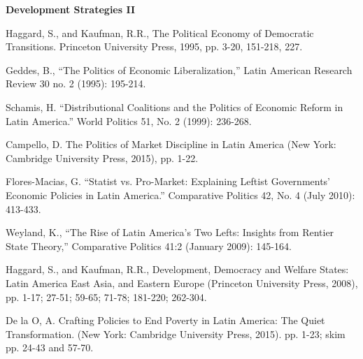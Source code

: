 \documentclass[letterpaper]{article}
\renewenvironment{itemize}{
  \begin{list}{}{
    \setlength{\leftmargin}{1.5em}
  }
}{
  \end{list}
}
\begin{document}
\begin{enumerate}
\item {\bf Development Strategies II}
	\begin{itemize}
		\item[$\bullet$] Haggard, S., and Kaufman, R.R., The Political Economy of Democratic Transitions. Princeton University Press, 1995, pp. 3-20, 151-218, 227.
		\item[$\bullet$] Geddes, B., ``The Politics of Economic Liberalization,'' Latin American Research Review 30 no. 2 (1995): 195-214.
		\item[$\bullet$] Schamis, H. ``Distributional Coalitions and the Politics of Economic Reform in Latin America.'' World Politics 51, No. 2 (1999): 236-268.
		\item[$\bullet$] Campello, D. The Politics of Market Discipline in Latin America (New York: Cambridge University Press, 2015), pp. 1-22.
		\item[$\bullet$] Flores-Macias, G. ``Statist vs. Pro-Market: Explaining Leftist Governments' Economic Policies in Latin America.'' Comparative Politics 42, No. 4 (July 2010): 413-433.
		\item[$\bullet$] Weyland, K., ``The Rise of Latin America's Two Lefts: Insights from Rentier State Theory,'' Comparative Politics 41:2 (January 2009): 145-164.
		\item[$\bullet$] Haggard, S., and Kaufman, R.R., Development, Democracy and Welfare States: Latin America East Asia, and Eastern Europe (Princeton University Press, 2008), pp. 1-17; 27-51; 59-65; 71-78; 181-220; 262-304.
		\item[$\bullet$] De la O, A. Crafting Policies to End Poverty in Latin America: The Quiet Transformation. (New York: Cambridge University Press, 2015). pp. 1-23; skim pp. 24-43 and 57-70.
	\end{itemize}



\end{enumerate}
\end{document}
